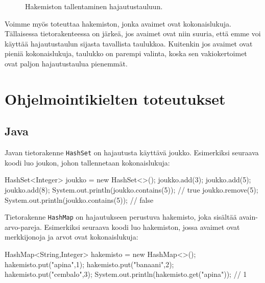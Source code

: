 \begin{figure}
\center
{}
\caption{Hakemiston tallentaminen hajautustauluun.}
\label{fig:hajhak}
\end{figure}

Voimme myös toteuttaa hakemiston, jonka avaimet ovat kokonaislukuja.
Tällaisessa tietorakenteessa on järkeä, jos avaimet ovat niin suuria,
että emme voi käyttää hajautustaulun sijasta tavallista taulukkoa.
Kuitenkin jos avaimet ovat pieniä kokonaislukuja,
taulukko on parempi valinta, koska sen vakiokertoimet
ovat paljon hajautustaulua pienemmät.

\section{Ohjelmointikielten toteutukset}

\subsection{Java}

Javan tietorakenne \texttt{HashSet} on
hajautusta käyttävä joukko.
Esimerkiksi seuraava koodi luo joukon, johon tallennetaan
kokonaislukuja:

\begin{code}
HashSet<Integer> joukko = new HashSet<>();
joukko.add(3);
joukko.add(5);
joukko.add(8);
System.out.println(joukko.contains(5)); // true
joukko.remove(5);
System.out.println(joukko.contains(5)); // false
\end{code}

Tietorakenne \texttt{HashMap} on hajautukseen
perustuva hakemisto, joka sisäl\-tää avain-arvo-pareja.
Esimerkiksi seuraava koodi luo hakemiston,
jossa avaimet ovat merkkijonoja ja arvot ovat kokonaislukuja:

\begin{code}
HashMap<String,Integer> hakemisto = new HashMap<>();
hakemisto.put("apina",1);
hakemisto.put("banaani",2);
hakemisto.put("cembalo",3);
System.out.println(hakemisto.get("apina")); // 1
\end{code}

